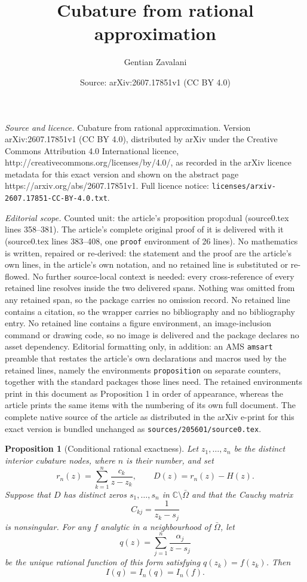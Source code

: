 \documentclass[10pt,a4paper]{amsart}
\title{Cubature from rational approximation}
\author{Gentian Zavalani}
\date{Source: arXiv:2607.17851v1 (CC BY 4.0)}
\newtheorem{proposition}{Proposition}
\newcommand{\C}{\mathbb{C}}
\begin{document}
\maketitle

\noindent\emph{Source and licence.} Cubature from rational approximation. Version arXiv:2607.17851v1 (CC BY 4.0), distributed by arXiv under the Creative Commons Attribution 4.0 International licence, http://creativecommons.org/licenses/by/4.0/, as recorded in the arXiv licence metadata for this exact version and shown on the abstract page https://arxiv.org/abs/2607.17851v1. Full licence notice: \texttt{licenses/arxiv-2607.17851-CC-BY-4.0.txt}.\par\smallskip

\noindent\textit{Editorial scope.} Counted unit: the article's proposition prop:dual (source0.tex lines 358--381). The article's complete original proof of it is delivered with it (source0.tex lines 383--408, one \texttt{proof} environment of 26 lines). No mathematics is written, repaired or re-derived: the statement and the proof are the article's own lines, in the article's own notation, and no retained line is substituted or re-flowed.  No further source-local context is needed: every cross-reference of every retained line resolves inside the two delivered spans.  Nothing was omitted from any retained span, so the package carries no omission record.  No retained line contains a citation, so the wrapper carries no bibliography and no bibliography entry.  No retained line contains a figure environment, an image-inclusion command or drawing code, so no image is delivered and the package declares no asset dependency.  Editorial formatting only, in addition: an AMS \texttt{amsart} preamble that restates the article's own declarations and macros used by the retained lines, namely the environments \texttt{proposition} on separate counters, together with the standard packages those lines need.  The retained environments print in this document as Proposition 1 in order of appearance, whereas the article prints the same items with the numbering of its own full document.  The complete native source of the article as distributed in the arXiv e-print for this exact version is bundled unchanged as \texttt{sources/205601/source0.tex}.
\begin{proposition}[Conditional rational exactness]
\label{prop:dual}
Let $z_1,\ldots,z_n$ be the distinct interior cubature nodes, where
$n$ is their number, and set
\[
  r_n(z)=\sum_{k=1}^n\frac{c_k}{z-z_k},
  \qquad D(z)=r_n(z)-H(z).
\]
Suppose that $D$ has distinct zeros $s_1,\ldots,s_n$ in
$\C\setminus\bar\Omega$ and that the Cauchy matrix
\[
  C_{kj}=\frac{1}{z_k-s_j}
\]
is nonsingular. For any $f$ analytic in a neighbourhood of
$\bar\Omega$, let
\[
  q(z)=\sum_{j=1}^n\frac{\alpha_j}{z-s_j}
\]
be the unique rational function of this form satisfying
$q(z_k)=f(z_k)$. Then
\[
  I(q)=I_n(q)=I_n(f).
\]
\end{proposition}
\end{document}
